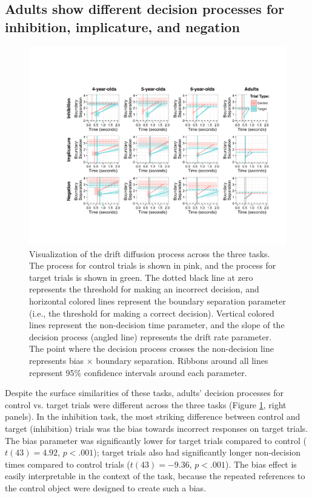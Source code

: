 \documentclass[10pt,letterpaper]{article}
\begin{document}
\subsection{Adults show different decision processes for inhibition, implicature, and negation}

\begin{figure}[t!]
\begin{center}
\includegraphics[width=\textwidth]{figures/ddm_vis.pdf}
\caption{\label{fig:ddm} Visualization of the drift diffusion process across the three tasks. The process for control trials is shown in pink, and the process for target trials is shown in green. The dotted black line at zero represents the threshold for making an incorrect decision, and horizontal colored lines represent the boundary separation parameter (i.e., the threshold for making a correct decision). Vertical colored lines represent the non-decision time parameter, and the slope of the decision process (angled line) represents the drift rate parameter. The point where the decision process crosses the non-decision line represents bias $\times$ boundary separation. Ribbons around all lines represent 95\% confidence intervals around each parameter.}
\end{center}
\end{figure}

Despite the surface similarities of these tasks, adults' decision processes for control vs. target trials were different across the three tasks (Figure \ref{fig:ddm}, right panels). In the inhibition task, the most striking difference between control and target (inhibition) trials was the bias towards incorrect responses on target trials. The bias parameter was significantly lower for target trials compared to control ($t(43) = 4.92$, $p< .001$); target trials also had significantly longer non-decision times compared to control trials ($t(43) = -9.36$, $p< .001$). The bias effect is easily interpretable in the context of the task, because the repeated references to the control object were designed to create such a bias.
\end{document}
